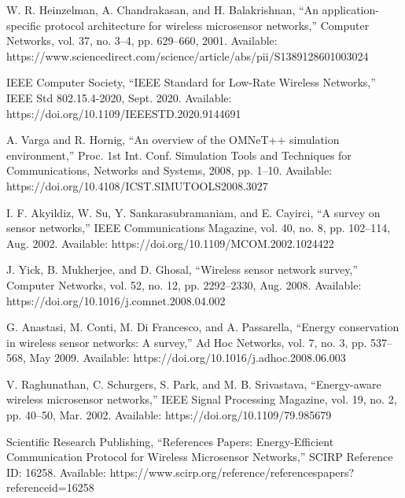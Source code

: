 \documentclass[conference]{IEEEtran}
\begin{document}
\begin{thebibliography}{99}

W. R. Heinzelman, A. Chandrakasan, and H. Balakrishnan, 
``An application-specific protocol architecture for wireless microsensor networks,'' 
Computer Networks, vol. 37, no. 3--4, pp. 629--660, 2001. Available: https://www.sciencedirect.com/science/article/abs/pii/S1389128601003024

IEEE Computer Society, 
``IEEE Standard for Low-Rate Wireless Networks,'' 
IEEE Std 802.15.4-2020, Sept. 2020. Available: https://doi.org/10.1109/IEEESTD.2020.9144691

A. Varga and R. Hornig, 
``An overview of the OMNeT++ simulation environment,'' 
Proc. 1st Int. Conf. Simulation Tools and Techniques for Communications, Networks and Systems, 2008, pp. 1--10. Available: https://doi.org/10.4108/ICST.SIMUTOOLS2008.3027

I. F. Akyildiz, W. Su, Y. Sankarasubramaniam, and E. Cayirci, 
``A survey on sensor networks,'' 
IEEE Communications Magazine, vol. 40, no. 8, pp. 102--114, Aug. 2002. Available: https://doi.org/10.1109/MCOM.2002.1024422

J. Yick, B. Mukherjee, and D. Ghosal,
``Wireless sensor network survey,''
Computer Networks, vol. 52, no. 12, pp. 2292--2330, Aug. 2008. Available: https://doi.org/10.1016/j.comnet.2008.04.002

G. Anastasi, M. Conti, M. Di Francesco, and A. Passarella,
``Energy conservation in wireless sensor networks: A survey,''
Ad Hoc Networks, vol. 7, no. 3, pp. 537--568, May 2009. Available: https://doi.org/10.1016/j.adhoc.2008.06.003

V. Raghunathan, C. Schurgers, S. Park, and M. B. Srivastava,
``Energy-aware wireless microsensor networks,''
IEEE Signal Processing Magazine, vol. 19, no. 2, pp. 40--50, Mar. 2002. Available: https://doi.org/10.1109/79.985679

Scientific Research Publishing, 
``References Papers: Energy-Efficient Communication Protocol for Wireless Microsensor Networks,'' 
SCIRP Reference ID: 16258. Available: https://www.scirp.org/reference/referencespapers?referenceid=16258

\end{thebibliography}
\end{document}
